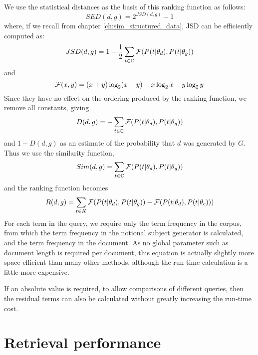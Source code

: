 We use the statistical distances as the basis of this ranking function as follows:
\begin{equation}
SED(d,g) = 2^{JSD(d,g)} - 1
\end{equation}
where, if we recall from chapter \ref{ch:sim_structured_data}, JSD can be efficiently computed as:
\begin{equation}
JSD(d,g) = 1 - \frac{1}{2}\sum_{t \in \mathbb{C}} \mathcal{F}(P(t|\theta_d),P(t|\theta_g))
\end{equation}
and
\begin{equation}
\mathcal{F}(x,y) = (x+y) \log_2 (x+y) - x \log_2 x  - y \log_2 y
\end{equation}
Since they have no effect on the ordering produced by the ranking function, we remove all constants, giving
\begin{equation}
D(d,g) = -\sum_{t \in \mathbb{C}} \mathcal{F}(P(t|\theta_d),P(t|\theta_g))
\end{equation}
and $1 - D(d, g)$ as an estimate of the probability that $d$ was generated by $G$.  Thus we use the similarity function, 
\begin{equation}
Sim(d, g) = \sum_{t \in \mathbb{C}} \mathcal{F}(P(t|\theta_d),P(t|\theta_g))
\end{equation}
and the ranking function becomes
\begin{equation}
R(d, g) = \sum_{t \in K} \mathcal{F}(P(t|\theta_d), P(t|\theta_g)) - \mathcal{F}(P(t|\theta_d), P(t|\theta_c)))
\end{equation}
For each term in the query, we require only the term frequency in the corpus, from which the term frequency in the notional subject generator is calculated, and the term frequency in the document. As no global parameter such as document length is required per document, this equation is actually slightly more space-efficient than many other methods, although the run-time calculation is a little more expensive.

If an absolute  value is required, to allow comparisons of different queries, then the residual terms can also be calculated without greatly increasing the run-time cost.

\section{Retrieval performance}

